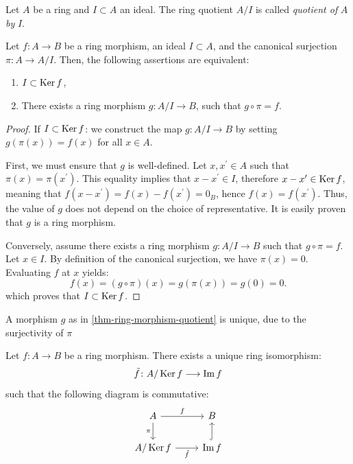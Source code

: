 \documentclass[12pt]{report}
\begin{document}
\begin{definition} \label{def-ring-quotient}
    Let $A$ be a ring and $I \subset A$ an ideal. The ring quotient $A / I$ is called \emph{quotient of} $A$ \emph{by} $I$.
\end{definition}

\begin{theorem} \label{thm-ring-morphism-quotient}
    Let $f \colon A \to B$ be a ring morphism, an ideal $I \subset A$, and the canonical surjection $\pi \colon A \to A / I$. Then, the following assertions are equivalent:
    \begin{enumerate}[label=(\roman*)]
        \item $I \subset \operatorname{Ker} f$,
        \item There exists a ring morphism $g \colon A / I \to B$, such that $g \circ \pi = f$.
    \end{enumerate}
\end{theorem}

\begin{proof}
    If $I \subset \operatorname{Ker} f$: we construct the map $g \colon A / I \longrightarrow B$ by setting $g(\pi(x)) = f(x)$ for all $x \in A$. 
        
    First, we must ensure that $g$ is well-defined. Let $x, x^{\prime} \in A$ such that $\pi(x) = \pi(x^{\prime})$. This equality implies that $x - x^{\prime} \in I$, therefore $x - x^{\prime} \in \operatorname{Ker} f$, meaning that $f(x - x^{\prime}) = f(x) - f(x^{\prime}) = 0_B$, hence $f(x) = f(x^{\prime})$. Thus, the value of $g$ does not depend on the choice of representative. It is easily proven that $g$ is a ring morphism.

    Conversely, assume there exists a ring morphism $g \colon A / I \longrightarrow B$ such that $g \circ \pi = f$. Let $x \in I$. By definition of the canonical surjection, we have $\pi(x) = 0$. Evaluating $f$ at $x$ yields:
    \[
        f(x) = (g \circ \pi)(x) = g(\pi(x)) = g(0) = 0.
    \]
    which proves that $I \subset \operatorname{Ker} f$.
\end{proof}

\begin{remark}
    A morphism $g$ as in \ref{thm-ring-morphism-quotient} is unique, due to the surjectivity of $\pi$
\end{remark}

\begin{corollary} \label{cor-ring-morphism-quotient}
Let $f \colon A \to B$ be a ring morphism. There exists a unique ring isomorphism:
    \[
        \tilde{f} \colon A / \operatorname{Ker} f \longrightarrow \operatorname{Im} f
    \]
    such that the following diagram is commutative:
    \[
        \begin{tikzcd}
            A \arrow[r, "f"] \arrow[d, "\pi"'] & B \\
            A / \Ker f \arrow[r, "\tilde{f}"'] & \Image f \arrow[u, hook]
        \end{tikzcd}
    \]
\end{corollary}
\end{document}
